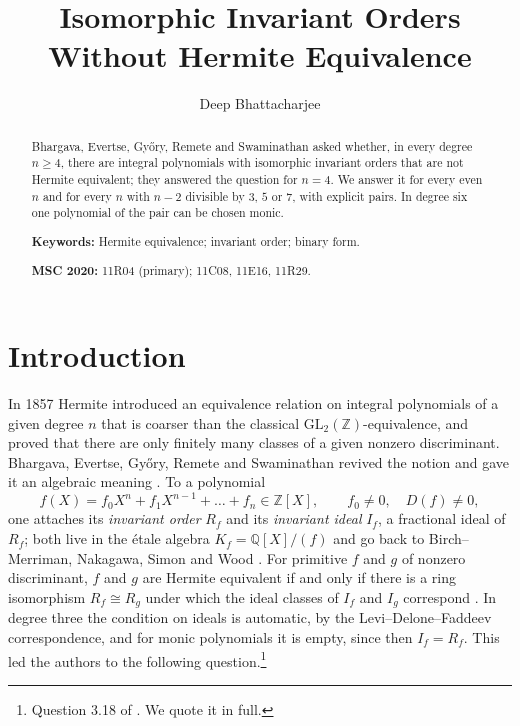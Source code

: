 \documentclass[11pt]{amsart}
\theoremstyle{definition}
\newcommand{\ZZ}{\mathbb{Z}}
\newcommand{\QQ}{\mathbb{Q}}
\begin{document}
\title[Isomorphic invariant orders without Hermite equivalence]{Isomorphic Invariant Orders\\ Without Hermite Equivalence}

\author{Deep Bhattacharjee}
\address{Formerly, Electro-Gravitational Space Propulsion Laboratory (EGSPL), Bhubaneswar, Odisha 751030, India}
\address{Formerly, University of Calcutta (Heramba Chandra College), 23/49 Gariahat Road, Golpark, Kolkata 700029, West Bengal, India}

\begin{abstract}
Bhargava, Evertse, Gy\H{o}ry, Remete and Swaminathan asked whether, in every degree $n\ge4$, there are integral polynomials with isomorphic invariant orders that are not Hermite equivalent; they answered the question for $n=4$. We answer it for every even $n$ and for every $n$ with $n-2$ divisible by $3$, $5$ or $7$, with explicit pairs. In degree six one polynomial of the pair can be chosen monic.

\medskip\noindent\textbf{Keywords:} Hermite equivalence; invariant order; binary form.

\smallskip\noindent\textbf{MSC 2020:} 11R04 (primary); 11C08, 11E16, 11R29.
\end{abstract}

\maketitle

\section{Introduction}\label{sec:intro}

In 1857 Hermite introduced an equivalence relation on integral polynomials of a given degree $n$ that is coarser than the classical $\mathrm{GL}_2(\ZZ)$-equivalence, and proved that there are only finitely many classes of a given nonzero discriminant. Bhargava, Evertse, Gy\H{o}ry, Remete and Swaminathan revived the notion and gave it an algebraic meaning \cite{BEGRS23}. To a polynomial
\[
f(X)=f_0X^n+f_1X^{n-1}+\dots+f_n\in\ZZ[X],\qquad f_0\neq0,\quad D(f)\neq0,
\]
one attaches its \emph{invariant order} $R_f$ and its \emph{invariant ideal} $I_f$, a fractional ideal of $R_f$; both live in the \'etale algebra $K_f=\QQ[X]/(f)$ and go back to Birch--Merriman, Nakagawa, Simon and Wood \cite{BM72,Nak89,Sim01,Woo11}. For primitive $f$ and $g$ of nonzero discriminant, $f$ and $g$ are Hermite equivalent if and only if there is a ring isomorphism $R_f\cong R_g$ under which the ideal classes of $I_f$ and $I_g$ correspond \cite[Corollary~3.12]{BEGRS23}. In degree three the condition on ideals is automatic, by the Levi--Delone--Faddeev correspondence, and for monic polynomials it is empty, since then $I_f=R_f$. This led the authors to the following question.\footnote{Question 3.18 of \cite{BEGRS23}. We quote it in full.}
\end{document}
